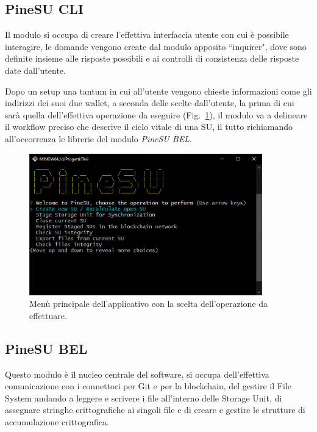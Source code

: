 \subsection{PineSU CLI}

Il modulo si occupa di creare l'effettiva interfaccia utente con cui è possibile interagire,
le domande vengono create dal modulo apposito ``inquirer", dove sono definite
insieme alle risposte possibili e ai controlli di consistenza delle risposte date dall'utente.

Dopo un setup una tantum in cui all'utente vengono chieste informazioni come gli indirizzi dei
suoi due wallet, a seconda delle scelte dall'utente, la prima di cui sarà quella dell'effettiva
operazione da eseguire (Fig.~\ref{fi:menu}), il modulo va a delineare il workflow preciso che descrive il ciclo vitale
di una SU, il tutto richiamando all'occorrenza le librerie del modulo \emph{PineSU BEL}. 

\begin{figure}[H]
    \centering
    \includegraphics[width=0.9\textwidth]{Figures/menu}
    \caption{\small{
    Menù principale dell'applicativo con la scelta dell'operazione da effettuare.
    } %
    } %
    \label{fi:menu}
\end{figure}


\subsection{PineSU BEL}

Questo modulo è il nucleo centrale del software, si occupa dell'effettiva comunicazione con i connettori per Git e per la blockchain, del gestire il File System andando a leggere e scrivere i file all'interno delle Storage Unit, di assegnare stringhe crittografiche ai singoli file e di creare e gestire le strutture di accumulazione crittografica.

